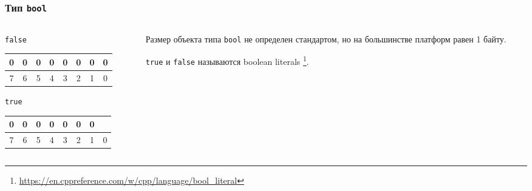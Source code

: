 \documentclass[compress, 8pt]{beamer}
\newenvironment{eightbit}{%
    \begin{center}
        \begin{tabular}{ |m{0.2cm}|m{0.2cm}|m{0.2cm}|m{0.2cm}|m{0.2cm}|m{0.2cm}|m{0.2cm}|m{0.2cm}|  }
            \hline
}{
        \hline
        \multicolumn{1}{c}{\color{gray}\tiny{7}} &
        \multicolumn{1}{c}{\color{gray}\tiny{6}} &
        \multicolumn{1}{c}{\color{gray}\tiny{5}} &
        \multicolumn{1}{c}{\color{gray}\tiny{4}} &
        \multicolumn{1}{c}{\color{gray}\tiny{3}} &
        \multicolumn{1}{c}{\color{gray}\tiny{2}} &
        \multicolumn{1}{c}{\color{gray}\tiny{1}} &
        \multicolumn{1}{c}{\color{gray}\tiny{0}} \\
        \end{tabular}
    \end{center}
}
\begin{document}
\begin{frame}[fragile]

    \frametitle{Тип \texttt{bool}}

    \begin{columns}[T]

        \begin{column}{0.5\textwidth}

            \verb|false|

            \begin{eightbit}
                0 & 0 & 0 & 0 & 0 & 0 & 0 & 0 \\
            \end{eightbit}

            \verb|true|

            \begin{eightbit}
                0 & 0 & 0 & 0 & 0 & 0 & 0 & \cellcolor{gray}{1} \\
            \end{eightbit}

        \end{column}

        \begin{column}{0.5\textwidth}

            Размер объекта типа \verb|bool| не определен стандартом,
            но на большинстве платформ равен 1 байту. \hfill \break

            \verb|true| и \verb|false| называются boolean literals
            \footnote{\tiny\url{https://en.cppreference.com/w/cpp/language/bool_literal}}.

        \end{column}

    \end{columns}

\end{frame}
\end{document}

